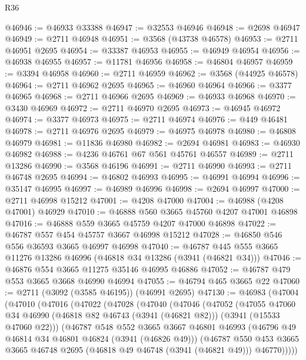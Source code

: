 \begin{lexlean}{R36}
\begin{coremodule}
@46946 := @46933 @33388
@46947 := @32553 @46946
@46948 := @2698 @46947
@46949 := @2711 @46948
@46951 := @3568 (@43738 @46578)
@46953 := @2711 @46951 @2695
@46954 := @33387 @46953
@46955 := @46949 @46954
@46956 := @46938 @46955
@46957 := @11781 @46956
@46958 := @46804 @46957
@46959 := @3394 @46958
@46960 := @2711 @46959
@46962 := @3568 (@44925 @46578)
@46964 := @2711 @46962 @2695
@46965 := @46960 @46964
@46966 := @3377 @46965
@46968 := @2711 @46966 @2695
@46969 := @46933 @46968
@46970 := @3430 @46969
@46972 := @2711 @46970 @2695
@46973 := @46945 @46972
@46974 := @3377 @46973
@46975 := @2711 @46974
@46976 := @449 @46481
@46978 := @2711 @46976 @2695
@46979 := @46975 @46978
@46980 := @46808 @46979
@46981 := @11836 @46980
@46982 := @2694 @46981
@46983 := @46930 @46982
@46988 := @4236 @46761 @67 @561 @45761 @46557
@46989 := @2711 @13286
@46990 := @3568 @46196
@46991 := @2711 @46990
@46993 := @2711 @46748 @2695
@46994 := @46802 @46993
@46995 := @46991 @46994
@46996 := @35147 @46995
@46997 := @46989 @46996
@46998 := @2694 @46997
@47000 := @2711 @46998 @15212
@47001 := @4208 @47000
@47004 := @46988 (@4208 @47001) @46929
@47010 := @46888 @560 @3665 @45760 @4207 @47001 @46898
@47016 := @46888 @559 @3665 @45759 @4207 @47000 @46898
@47022 := @46787 @557 @454 @45757 @3667 @46998 @15212
@47028 := @46850 @546 @556 @36593 @3665 @46997 @46998
@47040 := @46787 @445 @555 @3665 @11276 @13286 @46996 (@46818 @34 @13286 (@3941 (@46821 @34)))
@47046 := @46876 @554 @3665 @11275 @35146 @46995 @46886
@47052 := @46787 @479 @553 @3665 @3668 @46990 @46994
@47055 := @46794 @465 @3665 @22
@47060 := @2711 (@3092 (@3585 @46195)) (@46991 @2695)
@47130 := @46983
    (@47004
      (@47010
        (@47016
          (@47022
            (@47028
              (@47040
                (@47046
                  (@47052
                    (@47055
                      @47060
                      @34
                      @46990
                      (@46818 @82 @46743 (@3941 (@46821 @82)))
                      (@3941 (@15533 @47060 @22)))
                    (@46787
                      @548
                      @552
                      @3665
                      @3667
                      @46801
                      @46993
                      (@46796 @49 @46814 @34 @46801 @46824 (@3941 (@46826 @49)))
                      (@46787
                        @550
                        @453
                        @3665
                        @3665
                        @46748
                        @2695
                        (@46818 @49 @46748 (@3941 (@46821 @49)))
                        @46770)))))

\end{coremodule}
\end{lexlean}
